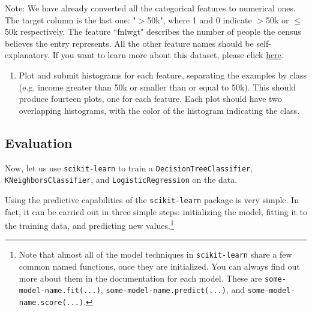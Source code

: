 \documentclass[11pt]{article}
\begin{document}
Note: We have already converted all the categorical features to numerical ones. The target column is the last one: "$>$50k", where 1 and 0 indicate $>$50k or $\le$ 50k respectively. The feature ``fnlwgt" describes the number of people the census believes the entry represents. All the other feature names should be self-explanatory. If you want to learn more about this dataset, please click  \href{https://archive.ics.uci.edu/ml/datasets/adult}{here}.

\begin{enumerate}
\item {} Plot and submit histograms for each feature, separating the examples by class (e.g. income greater than 50k or smaller than or equal to 50k). This should produce fourteen plots, one for each feature. Each plot should have two overlapping histograms, with the color of the histogram indicating the class.

\end{enumerate}

\subsection*{Evaluation}

Now, let us use \verb|scikit-learn| to train a \verb|DecisionTreeClassifier|, \verb|KNeighborsClassifier|, and \verb|LogisticRegression|  on the data.

Using the predictive capabilities of the \verb|scikit-learn| package is very simple. In fact, it can be carried out in three simple steps: initializing the model, fitting it to the training data, and predicting new values.\footnote{Note that almost all of the model techniques in \verb|scikit-learn| share a few common named functions, once they are initialized. You can always find out more about them in the documentation for each model. These are \verb|some-model-name.fit(...)|, \verb|some-model-name.predict(...)|, and \verb|some-model-name.score(...)|.}
\end{document}
